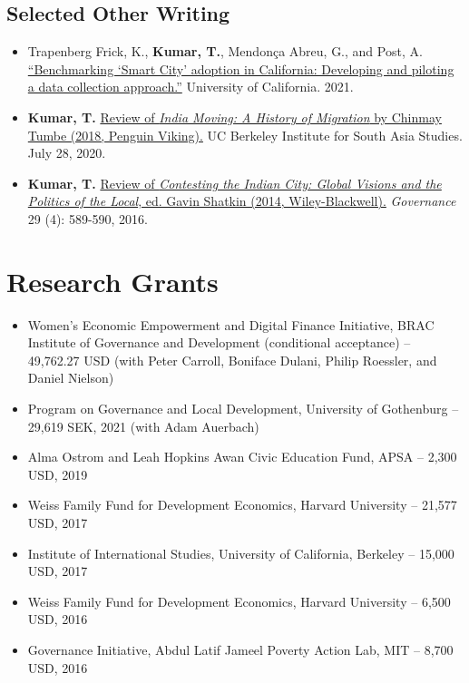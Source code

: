 \documentclass[11pt]{article}
\begin{document}
\subsection*{Selected Other Writing}	
\begin{itemize}
\item[]Trapenberg Frick, K., \textbf{Kumar, T.}, Mendon\c{c}a Abreu, G., and Post, A. \href{https://escholarship.org/uc/item/3797p0ws}{``Benchmarking `Smart City' adoption in California: Developing and piloting a data collection approach.''} University of California. 2021. 



\item[]\textbf{Kumar, T.} \href{https://southasia.berkeley.edu/sites/default/files/shared/India_Center/India_Moving.pdf}{Review of \textit{India Moving: A History of Migration} by Chinmay Tumbe (2018, Penguin Viking).}  UC Berkeley Institute for South Asia Studies. July 28, 2020.

\item[]\textbf{Kumar, T.} \href{http://onlinelibrary.wiley.com/doi/10.1111/gove.12241/abstract}{Review of \textit{Contesting the Indian City: Global Visions and the Politics of the Local}, ed. Gavin Shatkin (2014, Wiley-Blackwell).} \textit{Governance} 29 (4): 589-590, 2016. 



\end{itemize}


\vspace{2mm}
\color{MidnightBlue}

\section*{Research Grants}
\color{Black}
\begin{itemize}
\item[]Women's Economic Empowerment and Digital Finance Initiative, BRAC Institute of Governance and Development (conditional acceptance) -- 49,762.27 USD (with Peter Carroll, Boniface Dulani, Philip Roessler, and Daniel Nielson)

\item[] Program on Governance and Local Development, University of Gothenburg -- 29,619 SEK, 2021 (with Adam Auerbach)
\item[] Alma Ostrom and Leah Hopkins Awan Civic Education Fund, APSA -- 2,300 USD, 2019

\item[] Weiss Family Fund for Development Economics, Harvard University -- 21,577 USD, 2017


	 
\item[]Institute of International Studies, University of California, Berkeley -- 15,000 USD, 2017
\item[] Weiss Family Fund for Development Economics, Harvard University -- 6,500 USD, 2016 

\item[] Governance Initiative, Abdul Latif Jameel Poverty Action Lab, MIT -- 8,700 USD, 2016	
\end{itemize}
\end{document}
